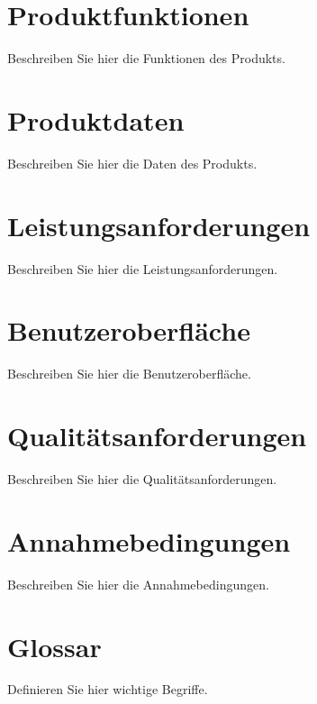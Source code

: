 \documentclass[a4paper,12pt]{article}
\begin{document}
\section{Produktfunktionen}
Beschreiben Sie hier die Funktionen des Produkts.

\section{Produktdaten}
Beschreiben Sie hier die Daten des Produkts.

\section{Leistungsanforderungen}
Beschreiben Sie hier die Leistungsanforderungen.

\section{Benutzeroberfläche}
Beschreiben Sie hier die Benutzeroberfläche.

\section{Qualitätsanforderungen}
Beschreiben Sie hier die Qualitätsanforderungen.

\section{Annahmebedingungen}
Beschreiben Sie hier die Annahmebedingungen.

\section{Glossar}
Definieren Sie hier wichtige Begriffe.
\end{document}
